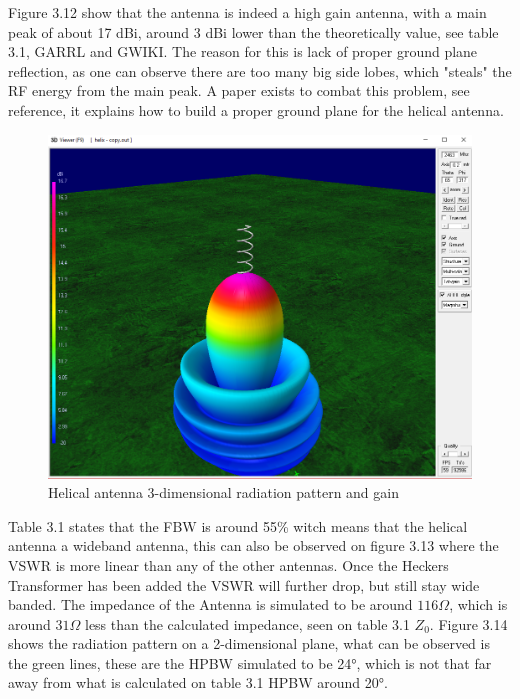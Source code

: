 Figure 3.12 show that the antenna is indeed a high gain antenna, with a main peak of about 17 dBi, around 3 dBi lower than the theoretically value, see table 3.1, GARRL and GWIKI. The reason for this is lack of proper ground plane reflection, as one can observe there are too many big side lobes, which "steals" the RF energy from the main peak. A paper exists to combat this problem, see reference\cite{HelicalGoodGround}, it explains how to build a proper ground plane for the helical antenna.  
\begin{figure}[h!]
\centering
\includegraphics[scale=0.55]{figures/HelicalAntennaRad.PNG}
\caption{Helical antenna 3-dimensional radiation pattern and gain}
\end{figure}

Table 3.1 states that the FBW is around 55\% witch means that the helical antenna a wideband antenna, this can also be observed on figure 3.13 where the VSWR is more linear than any of the other antennas. Once the Heckers Transformer has been added the VSWR will further drop, but still stay wide banded. The impedance of the Antenna is simulated to be around $116\Omega$, which is around $31\Omega$ less than the calculated impedance, seen on table 3.1 $Z_0$. Figure 3.14 shows the radiation pattern on a 2-dimensional plane, what can be observed is the green lines, these are the HPBW simulated to be \ang{24}, which is not that far away from what is calculated on table 3.1 HPBW around \ang{20}.    

